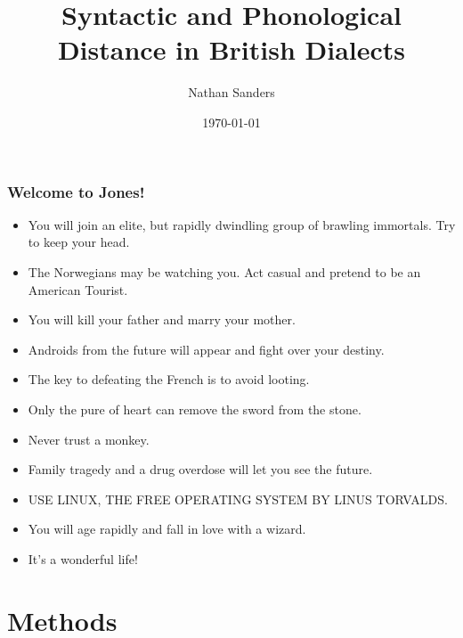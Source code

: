 \documentclass{beamer}
\title{Syntactic and Phonological Distance in British Dialects}
\author{Nathan Sanders}
\date{\today}
\begin{document}
\begin{frame}
  \frametitle{Welcome to Jones!}

  \begin{itemize}
  \item You will join an elite, but rapidly dwindling group of brawling immortals. Try to keep your head.
  \item The Norwegians may be watching you. Act casual and pretend to be an American Tourist.
  \item You will kill your father and marry your mother.
  \item  Androids from the future will appear and fight over your destiny.
  \item  The key to defeating the French is to avoid looting.
  \item  Only the pure of heart can remove the sword from the stone.
  \item  Never trust a monkey.
  \item  Family tragedy and a drug overdose will let you see the future.
  \item  USE LINUX, THE FREE OPERATING SYSTEM BY LINUS TORVALDS.
  \item  You will age rapidly and fall in love with a wizard.
  \item It's a wonderful life!
  \end{itemize}
\end{frame}

\frame{\titlepage}

\section[Outline]{}
\frame{\tableofcontents}

\section{Methods}
\end{document}
